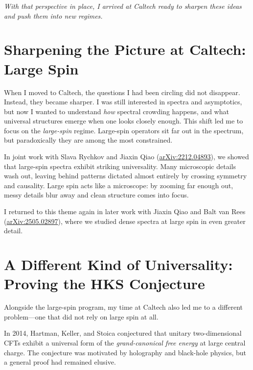 \documentclass[11pt, oneside]{article}
\begin{document}
\textit{With that perspective in place, I arrived at Caltech ready to sharpen these ideas and push them
into new regimes.}


\section*{Sharpening the Picture at Caltech: Large Spin}


When I moved to Caltech, the questions I had been circling did not disappear. Instead, they became
sharper. I was still interested in spectra and asymptotics, but now I wanted to understand \emph{how}
spectral crowding happens, and what universal structures emerge when one looks closely enough. This shift led me to focus on the \emph{large-spin} regime. Large-spin operators sit far out in the
spectrum, but paradoxically they are among the most constrained. 



In joint work with Slava Rychkov and Jiaxin Qiao
(\href{https://arxiv.org/abs/2212.04893}{arXiv:2212.04893}), we showed that large-spin spectra exhibit
striking universality. Many microscopic details wash out, leaving behind patterns dictated almost
entirely by crossing symmetry and causality. Large spin acts like a microscope: by zooming far enough
out, messy details blur away and clean structure comes into focus.



I returned to this theme again in later work with Jiaxin Qiao and Balt van Rees
(\href{https://arxiv.org/abs/2505.02897}{arXiv:2505.02897}), where we studied dense spectra at large spin
in even greater detail.


\section*{A Different Kind of Universality: Proving the HKS Conjecture}


Alongside the large-spin program, my time at Caltech also led me to a different problem—one that did not
rely on large spin at all.



In 2014, Hartman, Keller, and Stoica conjectured that unitary two-dimensional CFTs exhibit a universal
form of the \emph{grand-canonical free energy} at large central charge. The conjecture was motivated by
holography and black-hole physics, but a general proof had remained elusive.
\end{document}
